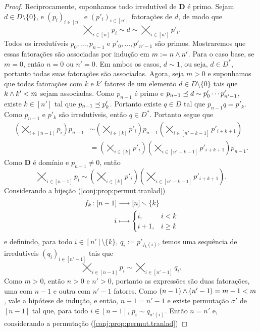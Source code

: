 \begin{proof}
Reciprocamente, suponhamos todo irredutível de $\bm D$ é primo. Sejam $d \in D \setminus \{0\}$, e $(p_i)_{i \in [n]}$ e $(p'_i)_{i \in [n']}$ fatorações de $d$, de modo que
	\begin{equation*}
	\bigtimes_{i \in [n]} p_i \sim d \sim \bigtimes_{i \in [n']} p'_i.
	\end{equation*}
Todos os irredutíveis $p_0,\ldots,p_{n-1}$ e $p'_0,\ldots,p'_{n'-1}$ são primos. Mostraremos que essas fatorações são associadas por indução em $m := n \mathbin{\wedge} n'$. Para o caso base, se $m=0$, então $n=0$ ou $n'=0$. Em ambos os casos, $d \sim 1$, ou seja, $d \in D^*$, portanto todas suas fatorações são associadas. Agora, seja $m > 0$ e suponhamos que todas fatorações com $k$ e $k'$ fatores de um elemento $d \in D \setminus \{0\}$ tais que $k \mathbin{\wedge} k' < m$ sejam associadas. Como $p_{n-1}$ é primo  e $p_{n-1} \preceq d \sim p'_0 \cdots p'_{n'-1}$, existe $k \in [n']$ tal que $p_{n-1} \preceq p'_k$. Portanto existe $q \in D$ tal que $p_{n-1}q = p'_k$. Como $p_{n-1}$ e $p'_k$ são irredutíveis, então $q \in D^*$. Portanto segue que
	\begin{align*}
	\left( \bigtimes_{i \in [n-1]} p_i \right) p_{n-1} &\sim \left( \bigtimes_{i \in [k]} p'_i \right) p_{n-1} \left( \bigtimes_{i \in [n'-k-1]} p'_{i+k+1} \right) \\
		&= \left( \bigtimes_{i \in [k]} p'_i \right)\left( \bigtimes_{i \in [n'-k-1]} p'_{i+k+1} \right) p_{n-1}.
	\end{align*}
Como $\bm D$ é domínio e $p_{n-1} \neq 0$, então
	\begin{equation*}
	\bigtimes_{i \in [n-1]} p_i \sim \left( \bigtimes_{i \in [k]} p'_i \right) \left( \bigtimes_{i \in [n'-k-1]} p'_{i+k+1} \right).
	\end{equation*}
Considerando a bijeção (\ref{conj:prop:permut.tranlad})
	\begin{align*}
	{f_k}\colon {[n-1]} &\longrightarrow {[n]\smallsetminus\{k\}} \\{i} &\longmapsto \begin{cases}
		i,& i < k \\
		i+1,& i \geq k
		\end{cases}
	\end{align*}
 e definindo, para todo $i \in [n'] \setminus \{k\}$, $q_i := p'_{f_k(i)}$, temos uma sequência de irredutíveis $(q_i)_{i \in [n'-1]}$ tais que
	\begin{equation*}
	\bigtimes_{i \in [n-1]} p_i \sim \bigtimes_{i \in [n'-1]} q_i.
	\end{equation*}
Como $m>0$, então $n>0$ e $n'>0$, portanto as expressões são duas fatorações, uma com $n-1$ e outra com $n'-1$ fatores. Como $(n-1) \mathbin{\wedge} (n'-1) = m-1 < m$, vale a hipótese de indução, e então, $n-1=n'-1$ e existe permutação $\sigma'$ de $[n-1]$ tal que, para todo $i \in [n-1]$, $p_i \sim q_{\sigma'(i)}$. Então  $n=n'$ e, considerando a permutação (\ref{conj:prop:permut.tranlad})

\end{proof}
